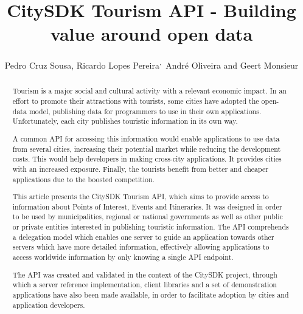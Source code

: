 \documentclass[times,doublespace]{ettauth}%
\begin{document}




\title{CitySDK Tourism API - Building value around open data}
\author{Pedro Cruz Sousa,
Ricardo Lopes Pereira\textsuperscript{,}\corrauth\,
Andr\'e Oliveira and 
Geert Monsieur}
\address{
 Instituto Superior T\'ecnico, Avenida Rovisco Pais 1, 1049-001 Lisboa, Portugal\\
 INESC-ID, Av. Prof. Dr. Cavaco Silva, 2744-016 Porto Salvo, Portugal\\
 ISA - Intelligent Sensing Anywhere S.A, Rua D. Manuel I, 30, 3030-320 Coimbra, Portugal\\
 European Research Institute in Service Science (ERISS), Tilburg University, Warandelaan 2, 5037AB Tilburg, The Netherlands
}

\begin{abstract}
Tourism is a major social and cultural activity with a relevant economic impact.
In an effort to promote their attractions with tourists, some cities have adopted the open-data model, publishing data for programmers to use in their own applications.
Unfortunately, each city publishes touristic information in its own way.

A common API for accessing this information would enable applications to use data from several cities, increasing their potential market while reducing the development costs.
This would help developers in making cross-city applications. It provides cities with an increased exposure. Finally, the tourists benefit from better and cheaper applications due to the boosted competition.

This article presents the CitySDK Tourism API, which aims to provide access to information about Points of Interest, Events and Itineraries.
It was designed in order to be used by municipalities, regional or national governments as well as other public or private entities interested in publishing touristic information.
The API comprehends a delegation model which enables one server to guide an application towards other servers which have more detailed information, effectively allowing applications to access worldwide information by only knowing a single API endpoint.

The API was created and validated in the context of the CitySDK project, through which a server reference implementation, client libraries and a set of demonstration applications have also been made available, in order to facilitate adoption by cities and application developers.

\end{abstract}
\end{document}
